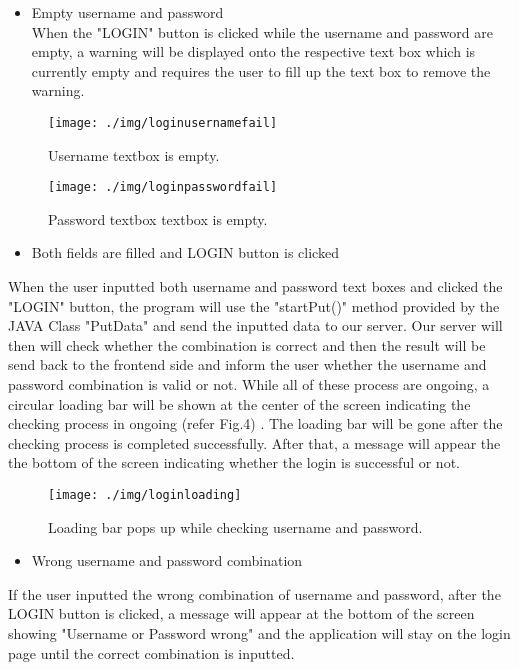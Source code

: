 \documentclass[conference]{IEEEtran}
\begin{document}
\begin{itemize}
\item Empty username and password\\
When the "LOGIN" button is clicked while the username and password are empty, a warning will be displayed onto the respective text box which is currently empty and requires the user to fill up the text box to remove the warning.
\end{itemize}

\begin{figure}[h!]
\texttt{[image: ./img/loginusernamefail]}
\centering
\caption{Username textbox is empty.}
\end{figure}
\begin{figure}[h!]
\texttt{[image: ./img/loginpasswordfail]}
\centering
\caption{Password textbox textbox is empty.}
\end{figure}

\begin{itemize}
\item Both fields are filled and LOGIN button is clicked
\end{itemize}
When the user inputted both username and password text boxes and clicked the "LOGIN" button, the program will use the "startPut()" method provided by the JAVA Class "PutData" and send the inputted data to our server. Our server will then will check whether the combination is correct and then the result will be send back to the frontend side and inform the user whether the username and password combination is valid or not. While all of these process are ongoing, a circular loading bar will be shown at the center of the screen indicating the checking process in ongoing (refer Fig.4) . The loading bar will be gone after the checking process is completed successfully. After that, a message will appear the the bottom of the screen indicating whether the login is successful or not.\\

\begin{figure}[h!]
\texttt{[image: ./img/loginloading]}
\centering
\caption{Loading bar pops up while checking username and password.}
\end{figure}

\begin{itemize}
\item Wrong username and password combination
\end{itemize}
If the user inputted the wrong combination of username and password, after the LOGIN button is clicked, a message will appear at the bottom of the screen showing "Username or Password wrong" and the application will stay on the login page until the correct combination is inputted.
\end{document}
